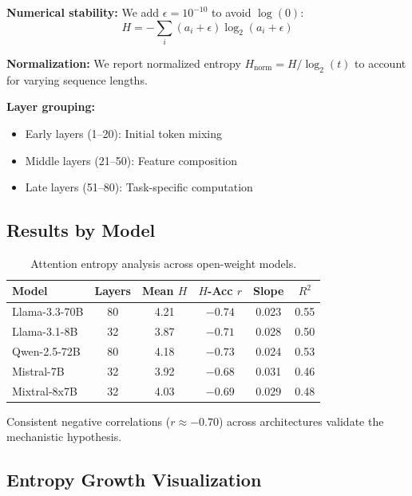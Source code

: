 \documentclass{article}
\theoremstyle{plain}
\theoremstyle{definition}
\theoremstyle{remark}
\begin{document}
\textbf{Numerical stability:} We add $\epsilon = 10^{-10}$ to avoid $\log(0)$:
\begin{equation}
H = -\sum_i (a_i + \epsilon) \log_2(a_i + \epsilon)
\end{equation}

\textbf{Normalization:} We report normalized entropy $H_\text{norm} = H/\log_2(t)$ to account for varying sequence lengths.

\textbf{Layer grouping:}
\begin{itemize}
\item Early layers (1--20): Initial token mixing
\item Middle layers (21--50): Feature composition
\item Late layers (51--80): Task-specific computation
\end{itemize}

\subsection{Results by Model}

\begin{table}[h]
\centering
\caption{Attention entropy analysis across open-weight models.}
\label{tab:entropy_full}
\small
\begin{tabular}{@{}lccccc@{}}
\toprule
\textbf{Model} & \textbf{Layers} & \textbf{Mean $H$} & \textbf{$H$-Acc $r$} & \textbf{Slope} & \textbf{$R^2$} \\
\midrule
Llama-3.3-70B & 80 & 4.21 & $-0.74$ & 0.023 & 0.55 \\
Llama-3.1-8B & 32 & 3.87 & $-0.71$ & 0.028 & 0.50 \\
Qwen-2.5-72B & 80 & 4.18 & $-0.73$ & 0.024 & 0.53 \\
Mistral-7B & 32 & 3.92 & $-0.68$ & 0.031 & 0.46 \\
Mixtral-8x7B & 32 & 4.03 & $-0.69$ & 0.029 & 0.48 \\
\bottomrule
\end{tabular}
\end{table}

Consistent negative correlations ($r \approx -0.70$) across architectures validate the mechanistic hypothesis.

\subsection{Entropy Growth Visualization}
\end{document}
